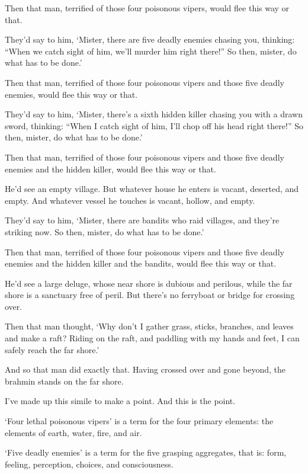 \documentclass[12pt,openany]{book}%
\begin{document}
Then that man, terrified of those four poisonous vipers, would flee this way or that. 

They’d say to him, ‘Mister, there are five deadly enemies chasing you, thinking: “When we catch sight of him, we’ll murder him right there!” So then, mister, do what has to be done.’ 

Then that man, terrified of those four poisonous vipers and those five deadly enemies, would flee this way or that. 

They’d say to him, ‘Mister, there’s a sixth hidden killer chasing you with a drawn sword, thinking: “When I catch sight of him, I’ll chop off his head right there!” So then, mister, do what has to be done.’ 

Then that man, terrified of those four poisonous vipers and those five deadly enemies and the hidden killer, would flee this way or that. 

He’d see an empty village. But whatever house he enters is vacant, deserted, and empty. And whatever vessel he touches is vacant, hollow, and empty. 

They’d say to him, ‘Mister, there are bandits who raid villages, and they’re striking now. So then, mister, do what has to be done.’ 

Then that man, terrified of those four poisonous vipers and those five deadly enemies and the hidden killer and the bandits, would flee this way or that. 

He’d see a large deluge, whose near shore is dubious and perilous, while the far shore is a sanctuary free of peril. But there’s no ferryboat or bridge for crossing over. 

Then that man thought, ‘Why don’t I gather grass, sticks, branches, and leaves and make a raft? Riding on the raft, and paddling with my hands and feet, I can safely reach the far shore.’ 

And so that man did exactly that. Having crossed over and gone beyond, the brahmin stands on the far shore. 

I’ve made up this simile to make a point. And this is the point. 

‘Four lethal poisonous vipers’ is a term for the four primary elements: the elements of earth, water, fire, and air. 

‘Five deadly enemies’ is a term for the five grasping aggregates, that is: form, feeling, perception, choices, and consciousness. 
\end{document}

